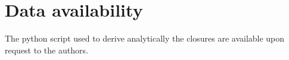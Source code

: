 \documentclass[11pt]{My_preprint}
\begin{document}
\section*{Data availability}

The python script used to derive analytically the closures are available upon request to the authors. 


\appendix






\end{document}
